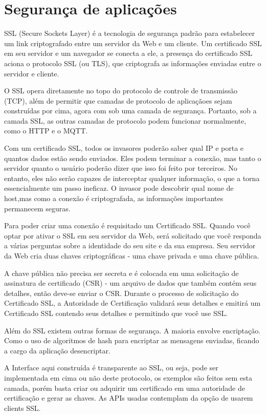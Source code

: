 \section{Segurança de aplicações}
\label{section:seguranca}

SSL \cite{ssl} (Secure Sockets Layer) é a tecnologia de segurança padrão para estabelecer um link criptografado entre um servidor da Web e um cliente. Um certificado SSL em seu servidor e um navegador se conecta a ele, a presença do certificado SSL aciona o protocolo SSL (ou TLS), que criptografa as informações enviadas entre o servidor e cliente.

O SSL opera diretamente no topo do protocolo de controle de transmissão (TCP), além de permitir que camadas de protocolo de aplicaçãoes sejam construídas por cima, agora com sob uma camada de segurança. Portanto, sob a camada SSL, as outras camadas de protocolo podem funcionar normalmente, como o HTTP e o MQTT.

Com um certificado SSL, todos os invasores poderão saber qual IP e porta e quantos dados estão sendo enviados. Eles podem terminar a conexão, mas tanto o servidor quanto o usuário poderão dizer que isso foi feito por terceiros. No entanto, eles não serão capazes de interceptar qualquer informação, o que a torna essencialmente um passo ineficaz. O invasor pode descobrir qual nome de host,mas como a conexão é criptografada, as informações importantes permanecem seguras.

Para poder criar uma conexão é requisitado um Certificado SSL. Quando você optar por ativar o SSL em seu servidor da Web, será solicitado que você responda a várias perguntas sobre a identidade do seu site e da sua empresa. Seu servidor da Web cria duas chaves criptográficas - uma chave privada e uma chave pública.

A chave pública não precisa ser secreta e é colocada em uma solicitação de assinatura de certificado (CSR) - um arquivo de dados que também contém seus detalhes, então deve-se enviar o CSR. Durante o processo de solicitação do Certificado SSL, a Autoridade de Certificação validará seus detalhes e emitirá um Certificado SSL contendo seus detalhes e permitindo que você use SSL.

Além do SSL existem outras formas de segurança. A maioria envolve encriptação. Como o uso de algoritmos de hash para encriptar as mensagens enviadas, ficando a cargo da aplicação desencriptar.

A Interface aqui construída é transparente ao SSL, ou seja, pode ser implementada em cima ou não deste protocolo, os exemplos são feitos sem esta camada, porém basta criar ou adquirir um certificado em uma autoridade de certificação e gerar as chaves. As APIs usadas contemplam da opção de usarem clients SSL.


